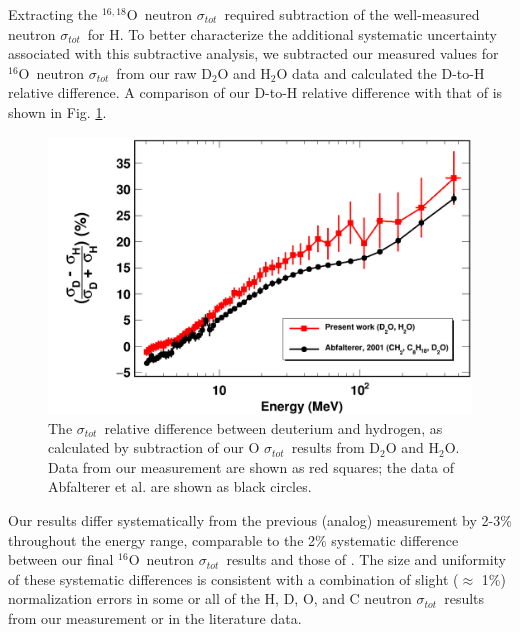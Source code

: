 \documentclass[twocolumn,secnumarabic,amssymb, nobibnotes, aps, prl,
superscriptaddress, nobalancelastpage]{revtex4}
\newcommand{\tot}{\ensuremath{\sigma_{tot}}}
\newcommand{\oSix}{\ensuremath{^{16}}O}
\newcommand{\oSixEight}{\ensuremath{^{16,18}}O}
\begin{document}
Extracting the \oSixEight\ neutron \tot\ required subtraction of the
well-measured neutron \tot\ for H. To better characterize
the additional systematic uncertainty
associated with this subtractive analysis, we subtracted our measured
values for \oSix\ neutron \tot\ from our raw D$_{2}$O and H$_{2}$O data and 
calculated the D-to-H relative difference. A
comparison of our D-to-H relative difference with that of
\cite{Abfalterer1998} is shown in Fig. \ref{DtoH}.
\begin{figure}[tb]
    \centering
    \includegraphics[width=\linewidth]{figures/relativeDiff_DtoH.png}
    \caption[\tot\ relative difference between deuterium and hydrogen from our measurement]
    {The \tot\ relative difference between deuterium and hydrogen,
        as calculated by subtraction of our O \tot\ results from
        D$_{2}$O and H$_{2}$O. Data from our measurement are shown as red
        squares; the data of Abfalterer et al. \cite{Abfalterer1998} are shown
    as black circles.}
    \label{DtoH}
\end{figure}
Our results differ systematically from the previous (analog) measurement by 2-3\% throughout the
energy range, comparable to the 2\% systematic difference between our final
\oSix\ neutron \tot\ results and those of \cite{Abfalterer2001}. The size and
uniformity of these systematic differences is consistent with
a combination of slight ($\approx$ 1\%) normalization errors
in some or all of the H, D, O, and C neutron \tot\ results
from our measurement or in the literature data.
\end{document}
